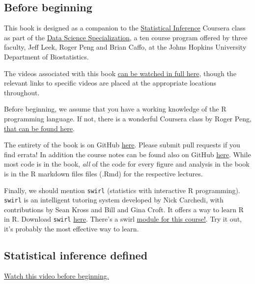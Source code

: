 \documentclass[]{article}
\begin{document}
\subsection{Before beginning}\label{before-beginning}

This book is designed as a companion to the
\href{https://www.coursera.org/course/statinference}{Statistical
Inference} Coursera class as part of the
\href{https://www.coursera.org/specialization/jhudatascience/1?utm_medium=courseDescripTop}{Data
Science Specialization}, a ten course program offered by three faculty,
Jeff Leek, Roger Peng and Brian Caffo, at the Johns Hopkins University
Department of Biostatistics.

The videos associated with this book
\href{https://www.youtube.com/watch?v=WkOinijQmPU\&list=PLpl-gQkQivXiBmGyzLrUjzsblmQsLtkzJ}{can
be watched in full here}, though the relevant links to specific videos
are placed at the appropriate locations throughout.

Before beginning, we assume that you have a working knowledge of the R
programming language. If not, there is a wonderful Coursera class by
Roger Peng, \href{https://www.coursera.org/course/rprog}{that can be
found here}.

The entirety of the book is on GitHub
\href{https://github.com/bcaffo/LittleInferenceBook}{here}. Please
submit pull requests if you find errata! In addition the course notes
can be found also on GitHub
\href{https://github.com/bcaffo/courses/tree/master/06_StatisticalInference}{here}.
While most code is in the book, \emph{all} of the code for every figure
and analysis in the book is in the R markdown files files (.Rmd) for the
respective lectures.

Finally, we should mention \texttt{swirl} (statistics with interactive R
programming). \texttt{swirl} is an intelligent tutoring system developed
by Nick Carchedi, with contributions by Sean Kross and Bill and Gina
Croft. It offers a way to learn R in R. Download \texttt{swirl}
\href{http://swirlstats.com}{here}. There's a swirl
\href{https://github.com/swirldev/swirl_courses\#swirl-courses}{module
for this course!}. Try it out, it's probably the most effective way to
learn.

\subsection{Statistical inference
defined}\label{statistical-inference-defined}

\href{http://youtu.be/WkOinijQmPU?list=PLpl-gQkQivXiBmGyzLrUjzsblmQsLtkzJ}{Watch
this video before beginning.}
\end{document}
